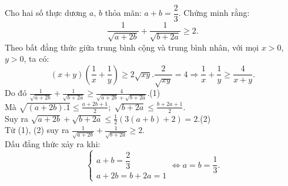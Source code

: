\begin{ex}%
Cho hai số thực dương $a,\,b$ 
thỏa mãn: 
$ a + b = \dfrac{2}{3}$.
Chứng minh rằng:   
$$\dfrac{1}{\sqrt {a + 2b}} + \dfrac{1}{\sqrt {b + 2a}} \ge 2.$$	
\loigiai
    {Theo bất đẳng thức giữa trung bình cộng và 
    	trung bình nhân, với mọi $x>0$, $y > 0$, ta có:
    	\[\left( x + y \right)\left( \frac{1}{x} + \frac{1}{y} \right) \ge 2\sqrt {xy} .\frac{2}{\sqrt {xy}} = 4 \Rightarrow \frac{1}{x} + \frac{1}{y} \ge \frac{4}{x + y}.\]
    	Do đó $\displaystyle\frac{1}{\sqrt {a + 2b}} + \frac{1}{\sqrt {b + 2a}} \ge \frac{4}{\sqrt {a + 2b}  + \sqrt {b + 2a} }$.\hfill(1)\\
    	Mà $\displaystyle\sqrt {\left( {a + 2b} \right).1}  \le \frac{a + 2b + 1}{2};\,\,\sqrt {b + 2a}  \le \frac{b + 2a + 1}{2}$.\\
    	Suy ra $\displaystyle\sqrt {a + 2b}  + \sqrt {b + 2a}  \le \frac{1}{2}\left( 3(a + b) + 2 \right) = 2$.\hfill(2)\\
    	Từ (1), (2) suy ra $\displaystyle\frac{1}{\sqrt {a + 2b}} + \frac{1}{\sqrt {b + 2a}} \ge 2$. \\
    	Dấu đẳng thức xảy ra khi:
    	\[\left\{ \begin{array}{l}
    	a + b = \dfrac{2}{3}\\
    	a + 2b = b + 2a = 1
    	\end{array} \right. \Leftrightarrow a = b = \frac{1}{3}.\]
    }
\end{ex}

